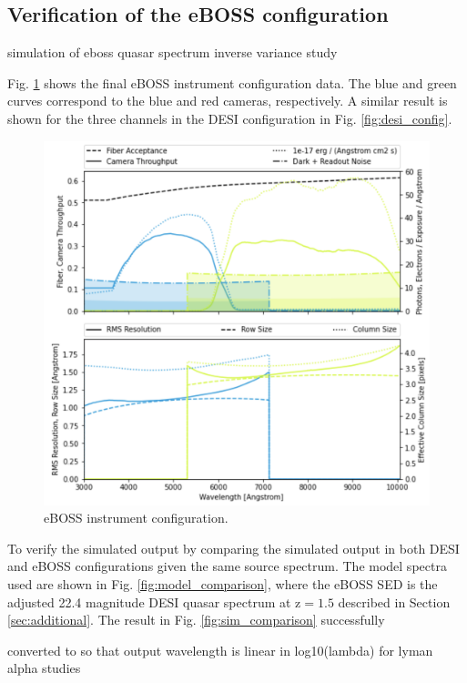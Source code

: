 \subsection{Verification of the eBOSS configuration}
\label{sec:verification}

simulation of eboss quasar spectrum
inverse variance study

Fig. \ref{fig:eboss_config} shows the final eBOSS instrument configuration data. The blue and green curves correspond to the blue and red cameras, respectively. A similar result is shown for the three channels in the DESI configuration in Fig. \ref{fig:desi_config}.

\begin{figure}[h]
\centering
\includegraphics[width=12cm]{images/specsim/eboss_config.png}
\caption{eBOSS instrument configuration.}
\label{fig:eboss_config}
\end{figure}


To verify the simulated output     by comparing the simulated output in both DESI and eBOSS configurations given the same source spectrum. The model spectra used are shown in Fig. \ref{fig:model_comparison}, where the eBOSS SED is the adjusted 22.4 magnitude DESI quasar spectrum at z$=1.5$ described in Section \ref{sec:additional}. The result in Fig. \ref{fig:sim_comparison} successfully 

converted to so that output wavelength is linear in log10(lambda) for lyman alpha studies

